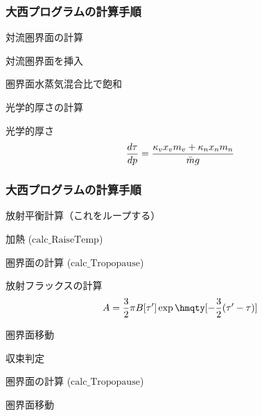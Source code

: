 \documentclass[aspectratio=149]{beamer}
\newcommand{\hmfnc}[1]{\(\mathrm{#1}\)}
\renewcommand{\qty}{\hmqty}
\begin{document}
\begin{frame}
	\frametitle{大西プログラムの計算手順}
	\begin{enu}[resume*=pros]
		\item 対流圏界面の計算
		\item 対流圏界面を挿入
		\item 圏界面水蒸気混合比で飽和
		\item 光学的厚さの計算
			\begin{block}{光学的厚さ}
				\begin{equation}
					\dv{\tau}{p}=\frac{\kappa_vx_vm_v+\kappa_nx_nm_n}{\bar mg}
				\end{equation}
			\end{block}
	\end{enu}
\end{frame}

\begin{frame}
	\frametitle{大西プログラムの計算手順}
	\begin{enu}[resume*=pros]
		\item 放射平衡計算（これをループする）
			\begin{enu}
				\item 加熱 (\hmfnc{calc\_RaiseTemp})
				\item 圏界面の計算 (\hmfnc{calc\_Tropopause})
					\begin{block}{放射フラックスの計算}
						\begin{equation}
							A=\frac{3}{2}\pi B[\tau']\exp\qty[-\frac{3}{2}(\tau'-\tau)]
						\end{equation}
					\end{block}
				\item 圏界面移動
				\item 収束判定
				\item 圏界面の計算 (\hmfnc{calc\_Tropopause})
				\item 圏界面移動
			\end{enu}
	\end{enu}
\end{frame}
\end{document}
